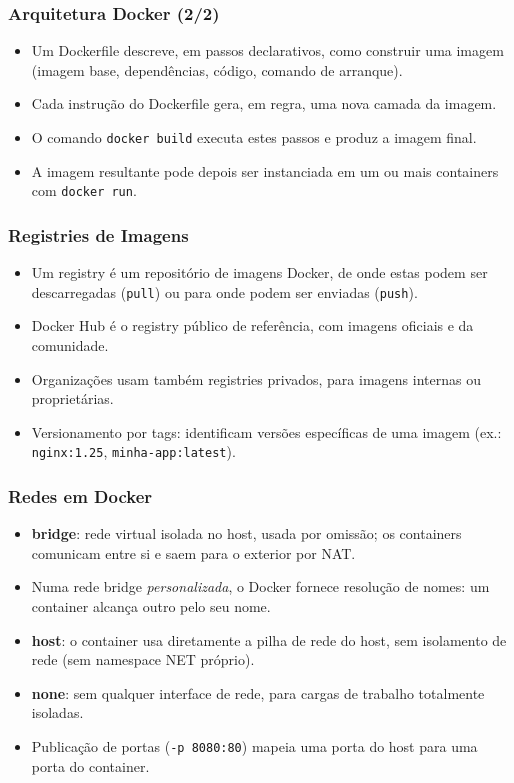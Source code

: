 \documentclass[aspectratio=169]{beamer}
\begin{document}
\begin{frame}
\frametitle{Arquitetura Docker \textcolor{NudeTaupe}{\small(2/2)}}
\begin{itemize}
    \setlength\itemsep{0.4cm}
    \item Um Dockerfile descreve, em passos declarativos, como construir uma imagem (imagem base, dependências, código, comando de arranque).
    \item Cada instrução do Dockerfile gera, em regra, uma nova camada da imagem.
    \item O comando \texttt{docker build} executa estes passos e produz a imagem final.
    \item A imagem resultante pode depois ser instanciada em um ou mais containers com \texttt{docker run}.
\end{itemize}
\end{frame}

\begin{frame}
\frametitle{Registries de Imagens}
\begin{itemize}
    \setlength\itemsep{0.4cm}
    \item Um registry é um repositório de imagens Docker, de onde estas podem ser descarregadas (\texttt{pull}) ou para onde podem ser enviadas (\texttt{push}).
    \item Docker Hub é o registry público de referência, com imagens oficiais e da comunidade.
    \item Organizações usam também registries privados, para imagens internas ou proprietárias.
    \item Versionamento por tags: identificam versões específicas de uma imagem (ex.: \texttt{nginx:1.25}, \texttt{minha-app:latest}).
\end{itemize}
\end{frame}

\begin{frame}
\frametitle{Redes em Docker}
\begin{itemize}
    \setlength\itemsep{0.4cm}
    \item \textbf{bridge}: rede virtual isolada no host, usada por omissão; os containers comunicam entre si e saem para o exterior por NAT.
    \item Numa rede bridge \emph{personalizada}, o Docker fornece resolução de nomes: um container alcança outro pelo seu nome.
    \item \textbf{host}: o container usa diretamente a pilha de rede do host, sem isolamento de rede (sem namespace NET próprio).
    \item \textbf{none}: sem qualquer interface de rede, para cargas de trabalho totalmente isoladas.
    \item Publicação de portas (\texttt{-p 8080:80}) mapeia uma porta do host para uma porta do container.
\end{itemize}
\end{frame}
\end{document}
